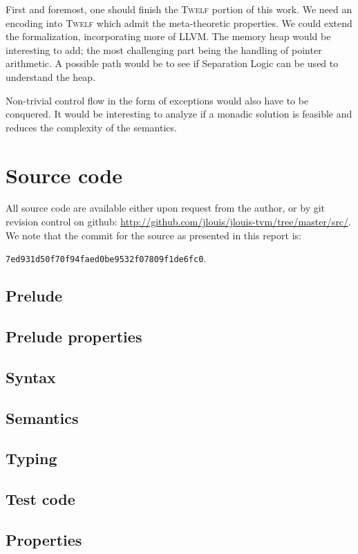 \documentclass[a4paper, oneside, 10pt, final]{memoir}
\newcommand{\twelf}{\textsc{Twelf}}
\begin{document}
First and foremost, one should finish the \twelf{} portion of this
work. We need an encoding into \twelf{} which admit the meta-theoretic
properties. We could extend the formalization, incorporating more of
LLVM. The memory heap would be interesting to add; the most
challenging part being the handling of pointer arithmetic. A possible
path would be to see if Separation
Logic\cite{reynolds:2002:separationlogic} can be used to understand
the heap.

Non-trivial control flow in the form of exceptions would also have to
be conquered. It would be interesting to analyze if a monadic solution
is feasible and reduces the complexity of the semantics.



\appendix
\chapter{Source code}
All source code are available either upon request from the author, or
by git revision control on github:
\url{http://github.com/jlouis/jlouis-tvm/tree/master/src/}. We note
that the commit for the source as presented in this report
is:
\begin{center}
  \texttt{7ed931d50f70f94faed0be9532f07809f1de6fc0}.
\end{center}

\section{Prelude}
{\footnotesize

}
\section{Prelude properties}
{\footnotesize

}
\section{Syntax}
{\footnotesize

}
\section{Semantics}
{\footnotesize

}
\section{Typing}
{\footnotesize

}
\section{Test code}
{\footnotesize

}
\section{Properties}
{\footnotesize

}
\end{document}
